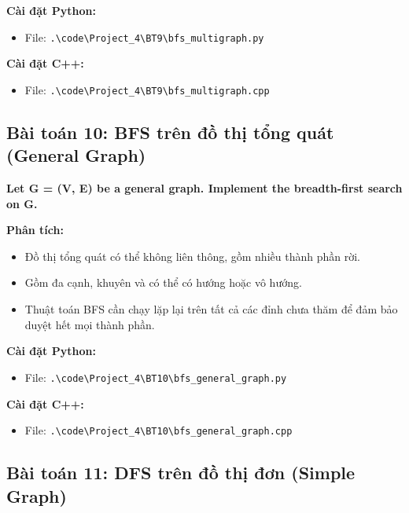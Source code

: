 \documentclass[12pt,a4paper]{article}
\begin{document}
\textbf{Cài đặt Python:}
\begin{itemize}[label=\textbullet]
   \item File: \texttt{.\textbackslash code\textbackslash Project\_4\textbackslash BT9\textbackslash bfs\_multigraph.py}
\end{itemize}

\textbf{Cài đặt C++:}
\begin{itemize}[label=\textbullet]
   \item File: \texttt{.\textbackslash code\textbackslash Project\_4\textbackslash BT9\textbackslash bfs\_multigraph.cpp}
\end{itemize}



\subsection{Bài toán 10: BFS trên đồ thị tổng quát (General Graph)}

\begin{problembox}
    \textbf{Let G = (V, E) be a general graph. Implement the breadth-first search on G.} 
\end{problembox}

\textbf{Phân tích:}
\begin{itemize}[label=\textbullet]
    \item Đồ thị tổng quát có thể không liên thông, gồm nhiều thành phần rời.
    \item Gồm đa cạnh, khuyên và có thể có hướng hoặc vô hướng.
    \item Thuật toán BFS cần chạy lặp lại trên tất cả các đỉnh chưa thăm để đảm bảo duyệt hết mọi thành phần.
\end{itemize}

\textbf{Cài đặt Python:}
\begin{itemize}[label=\textbullet]
   \item File: \texttt{.\textbackslash code\textbackslash Project\_4\textbackslash BT10\textbackslash bfs\_general\_graph.py}
\end{itemize}

\textbf{Cài đặt C++:}
\begin{itemize}[label=\textbullet]
   \item File: \texttt{.\textbackslash code\textbackslash Project\_4\textbackslash BT10\textbackslash bfs\_general\_graph.cpp}
\end{itemize}



\subsection{Bài toán 11: DFS trên đồ thị đơn (Simple Graph)}
\end{document}

